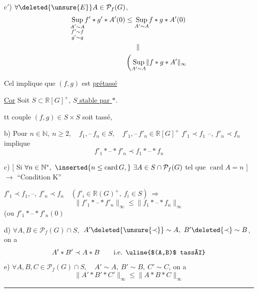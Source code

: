 c$'$) $\forall\deleted{\unsure{E}}A\in\mathcal P_f(G)$,
\[
 \begin{aligned}
 \underset{\substack{A'\sim A\\f'\sim f\\g'\sim g}}{\operatorname{Sup}} f'*g'*A'(0)
 &\leq\underset{A'\sim A}{\operatorname{Sup}}f*g*A'(0)\\
 &\hphantom{{}\leq{}}\parallel\\
 &\left(\underset{A'\sim A}{\operatorname{Sup}}\|f*g*A'\|_\infty\right.
 \end{aligned}
\]

Cel implique que $(f,g)$ est \uline{prétassé}

\uline{Cor} Soit $S\subset\mathbb R[G]^+$, \uline{$S$ stable par $*$}. 

  tt couple $(f,g)\in S\times S$ soit tassé, 

b)  Pour  $n\in\mathbb N,\ n\geq2,\quad f_1,\text{--}\,f_n\in S,\quad f'_1,\text{--}\,f'_n\in\mathbb R[G]^+$ $f'_1\prec f_1$ --, $f'_n\prec f_n$ implique
\[
 f'_1*\text{--}*f'_n\prec f_1*\text{--}*f_n
\]

c) [ Si $\forall n\in\mathbb N^{*},\ \inserted{n\leq\operatorname{card}G,}\ \exists A\in S\cap\mathcal P_f(G)$ tel que $\operatorname{card} A=n$ ] $\longrightarrow$ ``Condition K''

$f'_1\prec f_1,\text{--},\ f'_n\prec f_n\quad(f'_i\in\mathbb R(G)^+,\ f_i\in S)\ \Longrightarrow$
\[
 \|f'_1*\text{--}*f'_n\|_\infty\leq\|f_1*\text{--}*f_n\|_\infty
\]
(ou $f'_1*\text{--}*f'_n(0)$


d) $\forall A,B\in\mathcal P_f(G)\cap S,$ $A'\deleted{\unsure{\prec}}\sim A,\ B'\deleted{\prec}\sim B$, on a
\[
 A'*B'\prec A*B\qquad\text{i.e. \uline{$(A,B)$ tassé}}
\]
e) $\forall A,B,C\in\mathcal P_f(G)\cap S,\quad A'\sim A,\ B'\sim B,\ C'\sim C$, on a
\[
 \|A'*B'*C'\|_\infty\leq\|A*B*C\|_\infty
\]

\noindent\rule{\linewidth}{0.4pt}


